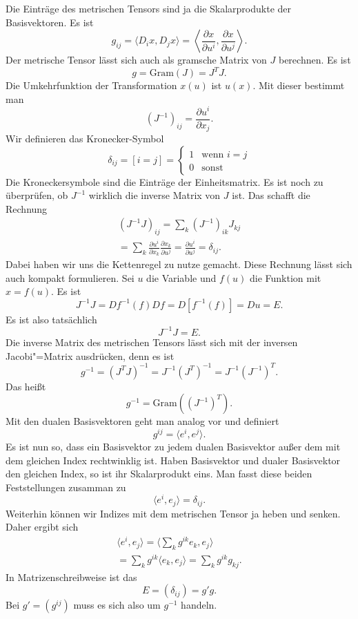 \documentclass[a4paper,10pt,fleqn,twocolumn,twoside]{article}
\begin{document}
Die Einträge des metrischen Tensors sind ja die Skalarprodukte der
Basisvektoren. Es ist
\[g_{ij} = \langle D_i x, D_j x\rangle
=  \left\langle \frac{\partial x}{\partial u^i},
\frac{\partial x}{\partial u^j}\right\rangle.\]
Der metrische Tensor lässt sich auch als gramsche Matrix von \(J\)
berechnen. Es ist
\[g = \mathrm{Gram}(J) = J^T\!J.\]
Die Umkehrfunktion der Transformation \(x(u)\) ist \(u(x)\).
Mit dieser bestimmt man
\[(J^{-1})_{ij} = \frac{\partial u^i}{\partial x_j}.\]
Wir definieren das Kronecker-Symbol
\[\delta_{ij} = [i=j]
= \begin{cases}
1 & \mathrm{wenn}\,\,i=j\\
0 & \mathrm{sonst}
\end{cases}\]
Die Kroneckersymbole sind die Einträge der Einheitsmatrix.
Es ist noch zu überprüfen, ob \(J^{-1}\) wirklich die inverse Matrix
von \(J\) ist. Das schafft die Rechnung
\begin{gather*}
(J^{-1}J)_{ij} = \sum_{k}(J^{-1})_{ik}J_{kj}\\
= \sum_{k} \frac{\partial u^i}{\partial x_k}
\frac{\partial x_k}{\partial u^j}
= \frac{\partial u^i}{\partial u^j}
= \delta_{ij}.
\end{gather*}
Dabei haben wir uns die Kettenregel zu nutze gemacht. Diese Rechnung
lässt sich auch kompakt formulieren. Sei \(u\) die Variable und
\(f(u)\) die Funktion mit \(x=f(u)\). Es ist
\[J^{-1}J = Df^{-1}(f)Df = D[f^{-1}(f)] = Du = E.\]
Es ist also tatsächlich
\[J^{-1}J = E.\]
Die inverse Matrix des metrischen Tensors lässt sich mit der inversen
Jacobi"=Matrix ausdrücken, denn es ist
\[g^{-1} = (J^T\!J)^{-1} = J^{-1}(J^T)^{-1} = J^{-1}(J^{-1})^T.\]
Das heißt
\[g^{-1} = \mathrm{Gram}((J^{-1})^T).\]
%
Mit den dualen Basisvektoren geht man analog vor und definiert
\[g^{ij} = \langle e^i, e^j\rangle.\]
Es ist nun so, dass ein Basisvektor zu jedem dualen Basisvektor außer
dem mit dem gleichen Index rechtwinklig ist. Haben Basisvektor und
dualer Basisvektor den gleichen Index, so ist ihr Skalarprodukt eins.
Man fasst diese beiden Feststellungen zusamman zu
\[\langle e^i,e_j\rangle = \delta_{ij}.\]
%
Weiterhin können wir Indizes mit dem metrischen Tensor ja heben und
senken. Daher ergibt sich
\begin{gather*}\langle e^i,e_j\rangle
= \langle \sum_{k} g^{ik}e_k,e_j\rangle\\
= \sum_{k}g^{ik}\langle e_k,e_j\rangle
= \sum_{k}g^{ik}g_{kj}.
\end{gather*}
In Matrizenschreibweise ist das
\[E = (\delta_{ij}) =  g'g.\]
Bei \(g'=(g^{ij})\) muss es sich also um \(g^{-1}\) handeln.
\end{document}
